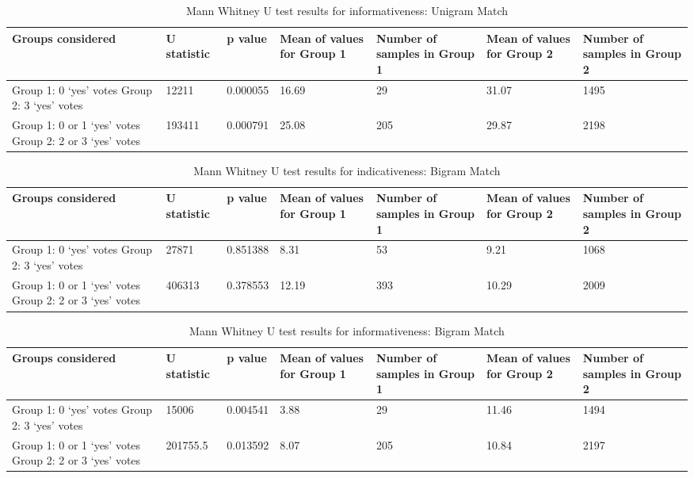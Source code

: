 \begin{table}[!htbp]
\caption{Mann Whitney U test results for informativeness: Unigram Match}
\centering
\label{tab:unicorr2}
\begin{tabular}{|p{}|p{}|p{}|p{}|p{}|p{}|p{}|}
\hline
Groups considered    & U statistic & p value & Mean of values for Group 1 & Number of samples in Group 1 & Mean of values for Group 2 & Number of samples in Group 2\\ \hline
Group 1: 0 `yes' votes \newline Group 2: 3 `yes' votes & 12211 & 0.000055  & 16.69 & 29 & 31.07 & 1495  \\ \hline
Group 1: 0 or 1 `yes' votes \newline Group 2: 2 or 3 `yes' votes & 193411 & 0.000791 & 25.08 & 205 & 29.87 & 2198 \\ \hline
\end{tabular}
\end{table}

\begin{table}[!htbp]
\caption{Mann Whitney U test results for indicativeness: Bigram Match}
\centering
\label{tab:bicorr1}
\begin{tabular}{|p{}|p{}|p{}|p{}|p{}|p{}|p{}|}
\hline
Groups considered    & U statistic & p value & Mean of values for Group 1 & Number of samples in Group 1 & Mean of values for Group 2 & Number of samples in Group 2\\ \hline
Group 1: 0 `yes' votes \newline Group 2: 3 `yes' votes & 27871 & 0.851388 & 8.31 & 53 & 9.21 & 1068  \\ \hline
Group 1: 0 or 1 `yes' votes \newline Group 2: 2 or 3 `yes' votes& 406313 & 0.378553 & 12.19 & 393 & 10.29 & 2009 \\ \hline
\end{tabular}
\end{table}

\begin{table}[!htbp]
\caption{Mann Whitney U test results for informativeness: Bigram Match}
\centering
\label{tab:bicorr2}
\begin{tabular}{|p{}|p{}|p{}|p{}|p{}|p{}|p{}|}
\hline
Groups considered    & U statistic & p value & Mean of values for Group 1 & Number of samples in Group 1 & Mean of values for Group 2 & Number of samples in Group 2\\ \hline
Group 1: 0 `yes' votes \newline Group 2: 3 `yes' votes & 15006 & 0.004541 & 3.88 & 29 & 11.46 & 1494  \\ \hline
Group 1: 0 or 1 `yes' votes \newline Group 2: 2 or 3 `yes' votes & 201755.5 & 0.013592 & 8.07 & 205 & 10.84 & 2197 \\ \hline
\end{tabular}
\end{table}



